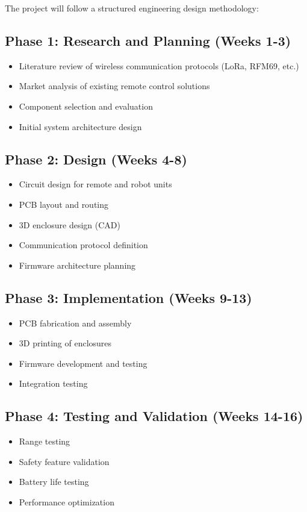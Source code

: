 The project will follow a structured engineering design methodology:

\subsection*{Phase 1: Research and Planning (Weeks 1-3)}
\begin{itemize}
    \item Literature review of wireless communication protocols (LoRa, RFM69, etc.)
    \item Market analysis of existing remote control solutions
    \item Component selection and evaluation
    \item Initial system architecture design
\end{itemize}

\subsection*{Phase 2: Design (Weeks 4-8)}
\begin{itemize}
    \item Circuit design for remote and robot units
    \item PCB layout and routing
    \item 3D enclosure design (CAD)
    \item Communication protocol definition
    \item Firmware architecture planning
\end{itemize}

\subsection*{Phase 3: Implementation (Weeks 9-13)}
\begin{itemize}
    \item PCB fabrication and assembly
    \item 3D printing of enclosures
    \item Firmware development and testing
    \item Integration testing
\end{itemize}

\subsection*{Phase 4: Testing and Validation (Weeks 14-16)}
\begin{itemize}
    \item Range testing
    \item Safety feature validation
    \item Battery life testing
    \item Performance optimization
\end{itemize}

